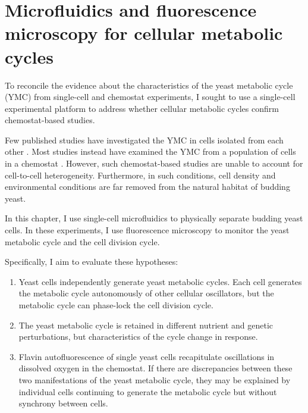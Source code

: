 \chapter{Microfluidics and fluorescence microscopy for cellular metabolic cycles}
\label{ch:biology}

To reconcile the evidence about the characteristics of the yeast metabolic cycle (YMC) from single-cell and chemostat experiments, I sought to use a single-cell experimental platform to address whether cellular metabolic cycles confirm chemostat-based studies.

Few published studies have investigated the YMC in cells isolated from each other \parencite{silvermanMetabolicCyclingSingle2010,papagiannakisAutonomousMetabolicOscillations2017,baumgartnerFlavinbasedMetabolicCycles2018,ozsezenInferenceHighLevelInteraction2019}.
Most studies instead have examined the YMC from a population of cells in a chemostat \parencite{tuLogicYeastMetabolic2005,tuCyclicChangesMetabolic2007,murrayRedoxRegulationRespiring2011,caustonMetabolicCyclesYeast2015,mellorMolecularBasisMetabolic2016,oneillEukaryoticCellBiology2020,amponsahPeroxiredoxinsCoupleMetabolism2021}.
However, such chemostat-based studies are unable to account for cell-to-cell heterogeneity.
Furthermore, in such conditions, cell density and environmental conditions are far removed from the natural habitat of budding yeast.

In this chapter, I use single-cell microfluidics to physically separate budding yeast cells.
In these experiments, I use fluorescence microscopy to monitor the yeast metabolic cycle and the cell division cycle.

Specifically, I aim to evaluate these hypotheses:
\begin{enumerate}
  \item Yeast cells independently generate yeast metabolic cycles.
        Each cell generates the metabolic cycle autonomously of other cellular oscillators, but the metabolic cycle can phase-lock the cell division cycle.
  \item The yeast metabolic cycle is retained in different nutrient and genetic perturbations, but characteristics of the cycle change in response.
  \item Flavin autofluorescence of single yeast cells recapitulate oscillations in dissolved oxygen in the chemostat.
        If there are discrepancies between these two manifestations of the yeast metabolic cycle, they may be explained by individual cells continuing to generate the metabolic cycle but without synchrony between cells.
\end{enumerate}

